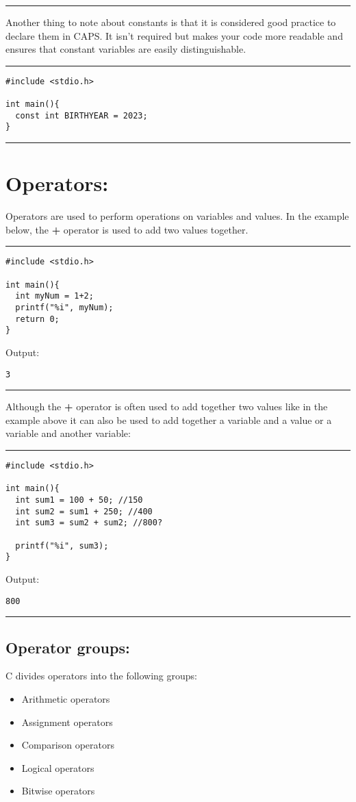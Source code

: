 \documentclass[a4paper]{article}
\begin{document}
\noindent\rule{\textwidth}{0.5pt}
Another thing to note about constants is that it is considered good practice to
declare them in CAPS. It isn't required but makes your code more readable and
ensures that constant variables are easily distinguishable.

\noindent\rule{\textwidth}{0.5pt}
\begin{verbatim}
#include <stdio.h>

int main(){
  const int BIRTHYEAR = 2023;
}
\end{verbatim}

\noindent\rule{\textwidth}{0.5pt}
\clearpage
\section{Operators:}
\label{sec:org7ad3a28}
Operators are used to perform operations on variables and values.
In the example below, the \textbf{+} operator is used to add two values together.

\noindent\rule{\textwidth}{0.5pt}
\begin{verbatim}
#include <stdio.h>

int main(){
  int myNum = 1+2;
  printf("%i", myNum);
  return 0;
}
\end{verbatim}
Output:
\begin{verbatim}
3
\end{verbatim}

\noindent\rule{\textwidth}{0.5pt}
Although the \textbf{+} operator is often used to add together two values like in the
example above it can also be used to add together a variable and a value or a
variable and another variable:

\noindent\rule{\textwidth}{0.5pt}
\begin{verbatim}
#include <stdio.h>

int main(){
  int sum1 = 100 + 50; //150 
  int sum2 = sum1 + 250; //400
  int sum3 = sum2 + sum2; //800?

  printf("%i", sum3);
}
\end{verbatim}
Output:
\begin{verbatim}
800
\end{verbatim}

\noindent\rule{\textwidth}{0.5pt}
\subsection{Operator groups:}
\label{sec:orge27db29}
C divides operators into the following groups:
\begin{itemize}
\item Arithmetic operators
\item Assignment operators
\item Comparison operators
\item Logical operators
\item Bitwise operators
\end{itemize}
\end{document}

